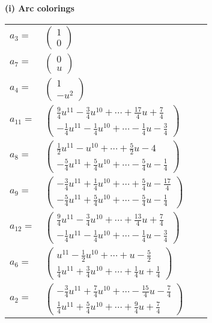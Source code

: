 \documentclass[1p]{elsarticle_modified}
\theoremstyle{definition}
\begin{document}
\flushleft \textbf{(i) Arc colorings}\\
\begin{tabular}{m{7pt} m{180pt} m{7pt} m{180pt} }
\flushright $a_{3}=$&$\begin{pmatrix}1\\0\end{pmatrix}$ \\
\flushright $a_{7}=$&$\begin{pmatrix}0\\u\end{pmatrix}$ \\
\flushright $a_{4}=$&$\begin{pmatrix}1\\- u^2\end{pmatrix}$ \\
\flushright $a_{11}=$&$\begin{pmatrix}\frac{9}{4} u^{11}-\frac{3}{4} u^{10}+\cdots+\frac{17}{4} u+\frac{7}{4}\\-\frac{1}{4} u^{11}-\frac{1}{4} u^{10}+\cdots-\frac{1}{4} u-\frac{3}{4}\end{pmatrix}$ \\
\flushright $a_{8}=$&$\begin{pmatrix}\frac{1}{2} u^{11}- u^{10}+\cdots+\frac{5}{2} u-4\\-\frac{5}{4} u^{11}+\frac{5}{4} u^{10}+\cdots-\frac{5}{4} u-\frac{1}{4}\end{pmatrix}$ \\
\flushright $a_{9}=$&$\begin{pmatrix}-\frac{3}{4} u^{11}+\frac{1}{4} u^{10}+\cdots+\frac{5}{4} u-\frac{17}{4}\\-\frac{5}{4} u^{11}+\frac{5}{4} u^{10}+\cdots-\frac{5}{4} u-\frac{1}{4}\end{pmatrix}$ \\
\flushright $a_{12}=$&$\begin{pmatrix}\frac{9}{4} u^{11}-\frac{3}{4} u^{10}+\cdots+\frac{13}{4} u+\frac{7}{4}\\-\frac{1}{4} u^{11}-\frac{1}{4} u^{10}+\cdots-\frac{1}{4} u-\frac{3}{4}\end{pmatrix}$ \\
\flushright $a_{6}=$&$\begin{pmatrix}u^{11}-\frac{1}{2} u^{10}+\cdots+u-\frac{5}{2}\\\frac{1}{4} u^{11}+\frac{3}{4} u^{10}+\cdots+\frac{1}{4} u+\frac{1}{4}\end{pmatrix}$ \\
\flushright $a_{2}=$&$\begin{pmatrix}-\frac{3}{4} u^{11}+\frac{7}{4} u^{10}+\cdots-\frac{15}{4} u-\frac{7}{4}\\\frac{1}{4} u^{11}+\frac{5}{4} u^{10}+\cdots+\frac{9}{4} u+\frac{7}{4}\end{pmatrix}$ \\

\end{tabular}
\end{document}

